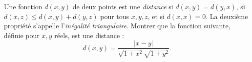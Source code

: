 Une fonction $d(x, y)$ de deux points est une \emph{distance} si $d(x, y) = d(y, x)$, si $d(x, z) \leq d(x, y) + d(y, z)$ pour tous $x, y, z$, et si $d(x, x) = 0$. La deuxième propriété s'appelle l'\emph{inégalité triangulaire}. Montrer que la fonction suivante, définie pour $x, y$ réels, est une distance :
\[ d(x, y) = \frac{|x - y|}{\sqrt{1 + x^2}\sqrt{1 + y^2}}. \]
